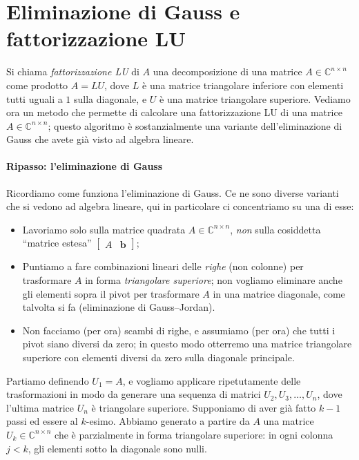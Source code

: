 \documentclass[a4paper]{report}
\theoremstyle{definition}
\theoremstyle{remark}
\renewcommand{\b}{\mathbf{b}}
\begin{document}
\section{Eliminazione di Gauss e fattorizzazione LU}

Si chiama \emph{fattorizzazione LU} di $A$ una decomposizione di una matrice $A\in\mathbb{C}^{n\times n}$ come prodotto $A=LU$, dove $L$ è una matrice triangolare inferiore con elementi tutti uguali a $1$ sulla diagonale, e $U$ è una matrice triangolare superiore. Vediamo ora un metodo che permette di calcolare una fattorizzazione LU di una matrice $A \in \mathbb{C}^{n\times n}$; questo algoritmo è sostanzialmente una variante dell'eliminazione di Gauss che avete già visto ad algebra lineare.

\paragraph{Ripasso: l'eliminazione di Gauss} Ricordiamo come funziona l'eliminazione di Gauss. Ce ne sono diverse varianti che si vedono ad algebra lineare, qui in particolare ci concentriamo su una di esse:
\begin{itemize}
    \item Lavoriamo solo sulla matrice quadrata $A\in\mathbb{C}^{n\times n}$, \emph{non} sulla cosiddetta ``matrice estesa'' $\begin{bmatrix}
    A & \b
\end{bmatrix}$;
    \item Puntiamo a fare combinazioni lineari delle \emph{righe} (non colonne) per trasformare $A$ in forma \emph{triangolare superiore}; non vogliamo eliminare anche gli elementi sopra il pivot per trasformare $A$ in una matrice diagonale, come talvolta si fa (eliminazione di Gauss--Jordan).
    \item Non facciamo (per ora) scambi di righe, e assumiamo (per ora) che tutti i pivot siano diversi da zero; in questo modo otterremo una matrice triangolare superiore con elementi diversi da zero sulla diagonale principale.
\end{itemize}
Partiamo definendo $U_1 = A$, e vogliamo applicare ripetutamente delle trasformazioni in modo da generare una sequenza di matrici $U_2, U_3, \dots, U_n$, dove l'ultima matrice $U_n$ è triangolare superiore. Supponiamo di aver già fatto $k-1$ passi ed essere al $k$-esimo. Abbiamo generato a partire da $A$ una matrice $U_k \in\mathbb{C}^{n\times n}$ che è parzialmente in forma triangolare superiore: in ogni colonna $j<k$, gli elementi sotto la diagonale sono nulli. 
\end{document}
